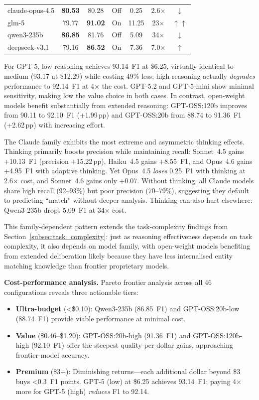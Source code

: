 \begin{table}[htbp]
\begin{tabular}{lccccccc}
claude-opus-4.5   & \textbf{80.53} & \multicolumn{2}{c}{80.28} & Off & 0.25 & 2.6$\times$ & $\downarrow$ \\
glm-5        & 79.77 & \multicolumn{2}{c}{\textbf{91.02}} & On & 11.25 & 23$\times$ & $\uparrow\uparrow$ \\
qwen3-235b   & \textbf{86.85} & \multicolumn{2}{c}{81.76} & Off & 5.09 & 34$\times$ & $\downarrow$ \\
deepseek-v3.1 & 79.16 & \multicolumn{2}{c}{\textbf{86.52}} & On & 7.36 & 7.0$\times$ & $\uparrow$ \\
\bottomrule
\end{tabular}
\end{table}

For GPT-5, low reasoning achieves 93.14~F1 at \$6.25, virtually identical to medium (93.17 at \$12.29) while costing 49\% less; high reasoning actually \emph{degrades} performance to 92.14~F1 at 4$\times$ the cost.  GPT-5.2 and GPT-5-mini show minimal sensitivity, making low the value choice in both cases.  In contrast, open-weight models benefit substantially from extended reasoning: GPT-OSS:120b improves from 90.11 to 92.10~F1 (+1.99\,pp) and GPT-OSS:20b from 88.74 to 91.36~F1 (+2.62\,pp) with increasing effort.

The Claude family exhibits the most extreme and asymmetric thinking effects.  Thinking primarily boosts precision while maintaining recall: Sonnet~4.5 gains +10.13~F1 (precision +15.22\,pp), Haiku~4.5 gains +8.55~F1, and Opus~4.6 gains +4.95~F1 with adaptive thinking.  Yet Opus~4.5 \emph{loses} 0.25~F1 with thinking at 2.6$\times$ cost, and Sonnet~4.6 gains only +0.07.  Without thinking, all Claude models share high recall (92--93\%) but poor precision (70--79\%), suggesting they default to predicting ``match'' without deeper analysis.  Thinking can also hurt elsewhere: Qwen3-235b drops 5.09~F1 at 34$\times$ cost.

This family-dependent pattern extends the task-complexity findings from Section~\ref{subsec:task_complexity}: just as reasoning effectiveness depends on task complexity, it also depends on model family, with open-weight models benefiting from extended deliberation likely because they have less internalised entity matching knowledge than frontier proprietary models.

\textbf{Cost-performance analysis.}  Pareto frontier analysis across all 46 configurations reveals three actionable tiers:
\begin{itemize}[leftmargin=*]
    \item \textbf{Ultra-budget} (\textless\$0.10): Qwen3-235b (86.85~F1) and GPT-OSS:20b-low (88.74~F1) provide viable performance at minimal cost.
    \item \textbf{Value} (\$0.46--\$1.20): GPT-OSS:20b-high (91.36~F1) and GPT-OSS:120b-high (92.10~F1) offer the steepest quality-per-dollar gains, approaching frontier-model accuracy.
    \item \textbf{Premium} (\$3+): Diminishing returns---each additional dollar beyond \$3 buys \textless0.3~F1 points.  GPT-5 (low) at \$6.25 achieves 93.14~F1; paying 4$\times$ more for GPT-5 (high) \emph{reduces} F1 to 92.14.
\end{itemize}

